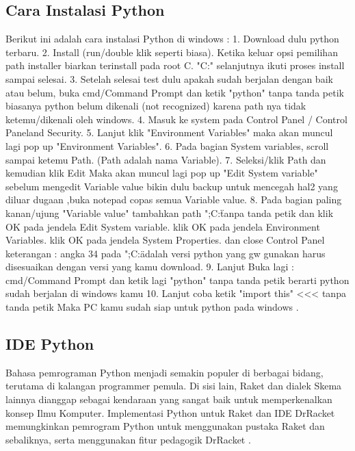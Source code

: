 \subsection{Cara Instalasi Python}
Berikut ini adalah cara instalasi Python di windows :
1.  Download dulu python terbaru.
2.  Install (run/double klik seperti biasa).
     Ketika keluar opsi pemilihan path installer biarkan terinstall pada root C. "C:"
     selanjutnya ikuti proses install sampai selesai.
3.  Setelah selesai test dulu apakah sudah berjalan dengan baik atau belum,
     buka cmd/Command Prompt dan ketik "python"  tanpa tanda petik
     biasanya python belum dikenali (not recognized) karena path nya tidak ketemu/dikenali oleh windows.
4.  Masuk ke system pada Control Panel / Control Panel\System and Security\System.
5.  Lanjut klik "Environment Variables" maka akan muncul lagi pop up "Environment Variables".
6.  Pada bagian System variables, scroll sampai ketemu Path. (Path adalah nama Variable).
7.  Seleksi/klik Path dan kemudian klik Edit
     Maka akan muncul lagi pop up "Edit System variable"
     sebelum mengedit Variable value bikin dulu backup untuk mencegah hal2 yang diluar dugaan ,buka notepad copas semua Variable value.
8. Pada bagian paling kanan/ujung "Variable value"
    tambahkan path  ";C:\"  tanpa tanda petik
    dan klik OK pada jendela Edit System variable.
    klik OK pada jendela Environment Variables.
    klik OK pada jendela System Properties.
    dan close Control Panel
    keterangan : angka 34 pada ";C:\"adalah versi python yang gw gunakan harus disesuaikan dengan versi yang kamu download.
9. Lanjut Buka lagi : cmd/Command Prompt dan ketik lagi "python" tanpa tanda petik 
    berarti python sudah berjalan di windows kamu
10. Lanjut coba ketik "import this" <<< tanpa tanda petik
     Maka PC kamu sudah siap untuk python pada windows \cite{nahado2015bumbu}.

\subsection {IDE Python}

Bahasa pemrograman Python menjadi semakin populer di berbagai bidang, terutama di kalangan programmer pemula. Di sisi lain, Raket dan dialek Skema lainnya dianggap sebagai kendaraan yang sangat baik untuk memperkenalkan konsep Ilmu Komputer. Implementasi Python untuk Raket dan IDE DrRacket memungkinkan pemrogram Python untuk menggunakan pustaka Raket dan sebaliknya, serta menggunakan fitur pedagogik DrRacket \cite {ramos2014implementing}.








